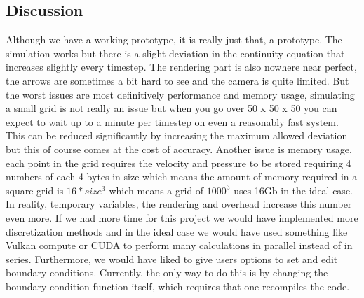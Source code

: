 \documentclass{article}
\begin{document}
\subsection{Discussion}
Although we have a working prototype, it is really just that, a prototype. The simulation works but there is a slight deviation in the continuity equation that increases slightly every timestep. The rendering part is also nowhere near perfect, the arrows are sometimes a bit hard to see and the camera is quite limited. But the worst issues are most definitively performance and memory usage, simulating a small grid is not really an issue but when you go over 50 x 50 x 50 you can expect to wait up to a minute per timestep on even a reasonably fast system. This can be reduced significantly by increasing the maximum allowed deviation but this of course comes at the cost of accuracy. Another issue is memory usage, each point in the grid requires the velocity and pressure to be stored requiring 4 numbers of each 4 bytes in size which means the amount of memory required in a square grid is $16*size^3$ which means a grid of $1000^3$ uses 16Gb in the ideal case. In reality, temporary variables, the rendering and overhead increase this number even more. If we had more time for this project we would have implemented more discretization methods and in the ideal case we would have used something like Vulkan compute or CUDA to perform many calculations in parallel instead of in series. Furthermore, we would have liked to give users options to set and edit boundary conditions. Currently, the only way to do this is by changing the boundary condition function itself, which requires that one recompiles the code.
\newpage
\end{document}
